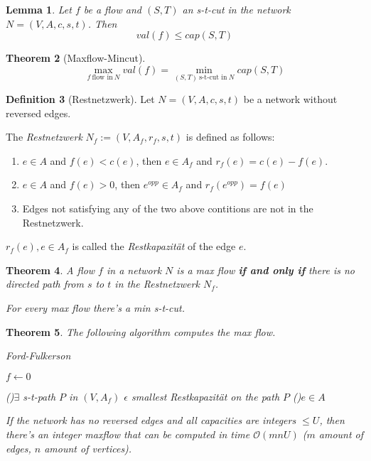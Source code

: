 \documentclass[12pt]{extarticle}
\theoremstyle{definition}
\newtheorem{definition}{Definition}[section]
\theoremstyle{remark}
\theoremstyle{plain}
\newtheorem{theorem}[definition]{Theorem}
\theoremstyle{plain}
\newtheorem{lemma}[definition]{Lemma}
\theoremstyle{plain}
\newcommand{\BO}{\mathcal{O}}
\begin{document}
\begin{lemma}
    Let $f$ be a flow and $(S, T)$ an s-t-cut in the network $N = (V, A, c, s, t)$.
    Then
    \[ val(f) \le cap(S, T) \]
\end{lemma}

\begin{theorem}[Maxflow-Mincut]
    \[ \max_{f\ \mbox{flow in}\ N} val(f) = \min_{(S, T)\ \mbox{s-t-cut in}\ N} cap(S, T) \]
\end{theorem}

\begin{definition}[Restnetzwerk]
    Let $N = (V, A, c, s, t)$ be a network without reversed edges.

    The \textit{Restnetzwerk} $N_f := (V, A_f, r_f, s, t)$ is defined as follows:
    \begin{enumerate}
        \item $e \in A$ and $f(e) < c(e)$, then $e \in A_f$ and $r_f(e) = c(e) - f(e)$.
        \item $e \in A$ and $f(e) > 0$, then $e^{opp} \in A_f$ and $r_f(e^{opp}) = f(e)$
        \item Edges not satisfying any of the two above contitions are not in the Restnetzwerk.
    \end{enumerate}

    $r_f(e), e \in A_f$ is called the \textit{Restkapazität} of the edge $e$.
\end{definition}

\begin{theorem}
    A flow $f$ in a network $N$ is a max flow \textbf{if and only if}
    there is no directed path from $s$ to $t$ in the Restnetzwerk $N_f$.

    For every max flow there's a min s-t-cut.
\end{theorem}

\begin{theorem}
    The following algorithm computes the max flow.
    \begin{algorithm}
        \caption{Ford-Fulkerson}
        $f \gets 0$\;

        \While(){$\exists$ s-t-path $P$ in $(V, A_f)$}{
            $\epsilon$ smallest Restkapazität on the path $P$\;
            \ForEach(){$e \in A$}{
            }
        }
    \end{algorithm}

    If the network has no reversed edges and all capacities are integers $\le U$, then there's
    an integer maxflow that can be computed in time $\BO(mnU)$ ($m$ amount of edges, $n$ amount of vertices).
\end{theorem}
\end{document}
